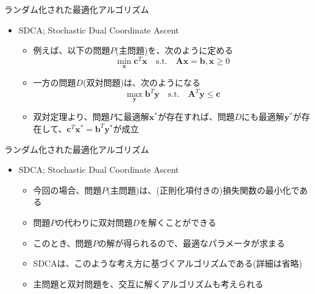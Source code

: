 \documentclass[dvipdfmx,notheorems,t]{beamer}
\begin{document}
\begin{frame}{ランダム化された最適化アルゴリズム}

\begin{itemize}
	\item SDCA; Stochastic Dual Coordinate Ascent
	\begin{itemize}		
		\item 例えば、以下の問題$P$(主問題)を、次のように定める
		\begin{equation}
			\min_{\bm{x}} \bm{c}^T \bm{x} \quad \mathrm{s.t.} \quad \bm{A} \bm{x} = \bm{b}, \bm{x} \ge 0
		\end{equation}
		
		\item 一方の問題$D$(双対問題)は、次のようになる
		\begin{equation}
			\max_{\bm{y}} \bm{b}^T \bm{y} \quad \mathrm{s.t.} \quad \bm{A}^T \bm{y} \le \bm{c}
		\end{equation}
		
		\item 双対定理より、問題$P$に最適解$\bm{x}^*$が存在すれば、問題$D$にも最適解$\bm{y}^*$が存在して、$\bm{c}^T \bm{x}^* = \bm{b}^T \bm{y}^*$が成立
	\end{itemize}
\end{itemize}

\end{frame}

\begin{frame}{ランダム化された最適化アルゴリズム}

\begin{itemize}
	\item SDCA; Stochastic Dual Coordinate Ascent
	\begin{itemize}		
		\item 今回の場合、問題$P$(主問題)は、(正則化項付きの)\alert{損失関数の最小化}である
		\item 問題$P$の代わりに双対問題$D$を解くことができる
		\item このとき、問題$P$の解が得られるので、最適なパラメータが求まる
		\newline
		
		\item SDCAは、このような考え方に基づくアルゴリズムである(詳細は省略)
		\newline
		
		\item 主問題と双対問題を、交互に解くアルゴリズムも考えられる
	\end{itemize}
\end{itemize}

\end{frame}
\end{document}
